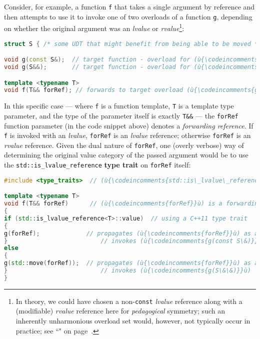 Consider, for example, a function \texttt{f} that takes a single
argument by reference and then attempts to use it to invoke one of two
overloads of a function \texttt{g}, depending on whether the original
argument was an \emph{lvalue} or \emph{rvalue}{\cprotect\footnote{In
theory, we could have chosen a non-\texttt{const} \emph{lvalue}
reference along with a (modifiable) \emph{rvalue} reference here for
\emph{pedagogical} symmetry; such an inherently unharmonious overload
set would, however, not typically occur in practice; see ``" on page~\pageref{Rvalue-References}.}}:

\begin{lstlisting}[language=C++]
struct S { /* some UDT that might benefit from being able to be moved */ };

void g(const S&);  // target function - overload for (ù{\codeincomments{const}}ù) (ù{\codeincomments{int}}ù) lvalues
void g(S&&);       // target function - overload for (ù{\codeincomments{int}}ù) rvalues only

template <typename T>
void f(T&& forRef); // forwards to target overload (ù{\codeincomments{g}}ù) based on value category
\end{lstlisting}

\noindent In this specific case --- where \texttt{f} is a function template,
\texttt{T} is a template type parameter, and the type of the parameter
itself is exactly \texttt{T\&\&} --- the \texttt{forRef} function
parameter (in the code snippet above) denotes a \emph{forwarding reference}. If \texttt{f}\label{f-invoked-example}
is invoked with an \emph{lvalue}, \texttt{forRef} is an \emph{lvalue}
reference; otherwise \texttt{forRef} is an \emph{rvalue} reference.
Given the dual nature of \texttt{forRef}, one (overly verbose) way of
determining the original value category of the passed argument would be
to use the \texttt{std::is\_lvalue\_reference} \textbf{type trait} on
\texttt{forRef} itself:

\begin{lstlisting}[language=C++]
#include <type_traits>  // (ù{\codeincomments{std::is\_lvalue\_reference}}ù)

template <typename T>
void f(T&& forRef)      // (ù{\codeincomments{forRef}}ù) is a forwarding reference.
{
if (std::is_lvalue_reference<T>::value)  // using a C++11 type trait
{
g(forRef);             // propagates (ù{\codeincomments{forRef}}ù) as an *lvalue*
}                          // invokes (ù{\codeincomments{g(const S\&)}}ù)
else
{
g(std::move(forRef));  // propagates (ù{\codeincomments{forRef}}ù) as an *rvalue*
}                          // invokes (ù{\codeincomments{g(S\&\&)}}ù)
}
\end{lstlisting}

